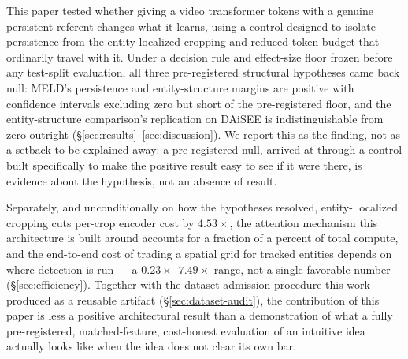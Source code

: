 \label{sec:conclusion}

This paper tested whether giving a video transformer tokens with a genuine
persistent referent changes what it learns, using a control designed to
isolate persistence from the entity-localized cropping and reduced token
budget that ordinarily travel with it. Under a decision rule and effect-size
floor frozen before any test-split evaluation, all three pre-registered
structural hypotheses came back null: MELD's persistence and entity-structure
margins are positive with confidence intervals excluding zero but short of
the pre-registered floor, and the entity-structure comparison's replication
on DAiSEE is indistinguishable from zero outright
(\S\ref{sec:results}--\ref{sec:discussion}). We report this as the finding,
not as a setback to be explained away: a pre-registered null, arrived at
through a control built specifically to make the positive result easy to
see if it were there, is evidence about the hypothesis, not an absence of
result.

Separately, and unconditionally on how the hypotheses resolved, entity-
localized cropping cuts per-crop encoder cost by $4.53\times$, the attention
mechanism this architecture is built around accounts for a fraction of a
percent of total compute, and the end-to-end cost of trading a spatial grid
for tracked entities depends on where detection is run --- a
$0.23\times$--$7.49\times$ range, not a single favorable number
(\S\ref{sec:efficiency}). Together with the dataset-admission procedure this
work produced as a reusable artifact (\S\ref{sec:dataset-audit}), the
contribution of this paper is less a positive architectural result than a
demonstration of what a fully pre-registered, matched-feature, cost-honest
evaluation of an intuitive idea actually looks like when the idea does not
clear its own bar.
